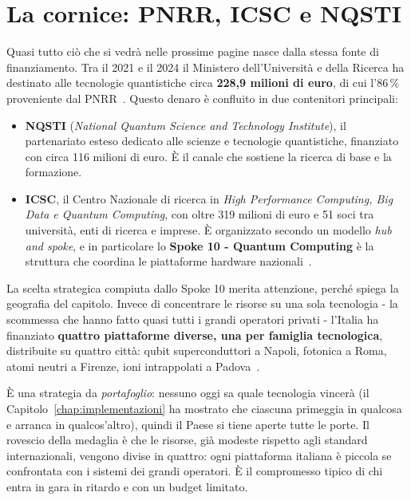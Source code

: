 \section{La cornice: PNRR, ICSC e NQSTI}
\label{sec:it-cornice}

Quasi tutto ciò che si vedrà nelle prossime pagine nasce dalla stessa fonte di
finanziamento. Tra il 2021 e il 2024 il Ministero dell'Università e della
Ricerca ha destinato alle tecnologie quantistiche circa
\textbf{228,9 milioni di euro}, di cui l'$86\,\%$ proveniente dal
PNRR~\cite{osservatori2025quantum}. Questo denaro è confluito in due
contenitori principali:

\begin{itemize}
  \item \textbf{NQSTI} (\textit{National Quantum Science and Technology
    Institute}), il partenariato esteso dedicato alle scienze e tecnologie
    quantistiche, finanziato con circa 116 milioni di euro. È il canale che
    sostiene la ricerca di base e la formazione.

  \item \textbf{ICSC}, il Centro Nazionale di ricerca in \textit{High
    Performance Computing, Big Data e Quantum Computing}, con oltre 319
    milioni di euro e 51 soci tra università, enti di ricerca e imprese. È
    organizzato secondo un modello \textit{hub and spoke}, e in particolare lo
    \textbf{Spoke 10 - Quantum Computing} è la struttura che coordina le
    piattaforme hardware nazionali~\cite{icsc2026partenope}.
\end{itemize}

La scelta strategica compiuta dallo Spoke 10 merita attenzione, perché spiega
la geografia del capitolo. Invece di concentrare le risorse su una sola
tecnologia - la scommessa che hanno fatto quasi tutti i grandi operatori
privati - l'Italia ha finanziato \textbf{quattro piattaforme diverse, una per
famiglia tecnologica}, distribuite su quattro città: qubit superconduttori a
Napoli, fotonica a Roma, atomi neutri a Firenze, ioni intrappolati a
Padova~\cite{icsc2026partenope}.

\begin{notabox}
  È una strategia da \textit{portafoglio}: nessuno oggi sa quale tecnologia
  vincerà (il Capitolo~\ref{chap:implementazioni} ha mostrato che ciascuna
  primeggia in qualcosa e arranca in qualcos'altro), quindi il Paese si tiene
  aperte tutte le porte. Il rovescio della medaglia è che le risorse, già
  modeste rispetto agli standard internazionali, vengono divise in quattro:
  ogni piattaforma italiana è piccola se confrontata con i sistemi dei grandi
  operatori. È il compromesso tipico di chi entra in gara in ritardo e con un
  budget limitato.
\end{notabox}

